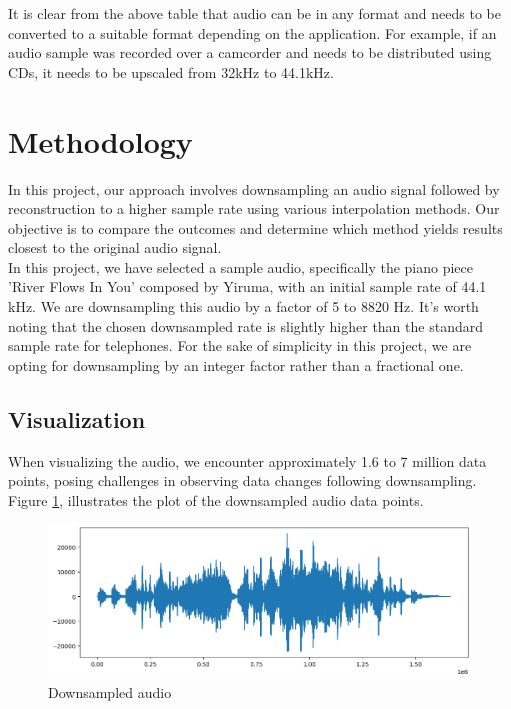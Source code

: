 \documentclass{article}
\begin{document}
It is clear from the above table that audio can be in any format and needs to be converted to a suitable format depending on the application. For example, if an audio sample was recorded over a camcorder and needs to be distributed using CDs, it needs to be upscaled from 32kHz to 44.1kHz.


\section{Methodology}

In this project, our approach involves downsampling an audio signal followed by reconstruction to a higher sample rate using various interpolation methods. Our objective is to compare the outcomes and determine which method yields results closest to the original audio signal. \\

In this project, we have selected a sample audio, specifically the piano piece 'River Flows In You' composed by Yiruma, with an initial sample rate of 44.1 kHz.\cite{yiruma} We are downsampling this audio by a factor of 5 to 8820 Hz. It's worth noting that the chosen downsampled rate is slightly higher than the standard sample rate for telephones. For the sake of simplicity in this project, we are opting for downsampling by an integer factor rather than a fractional one. 

\subsection{Visualization }

When visualizing the audio, we encounter approximately 1.6 to 7 million data points, posing challenges in observing data changes following downsampling. Figure \ref{fig:downsampled audio}, illustrates the plot of the downsampled audio data points.
\begin{figure}[h]
    \centering
    \includegraphics[width=\textwidth]{downSampled.png}
    \caption{Downsampled audio}
    \label{fig:downsampled audio}
\end{figure}
\end{document}
